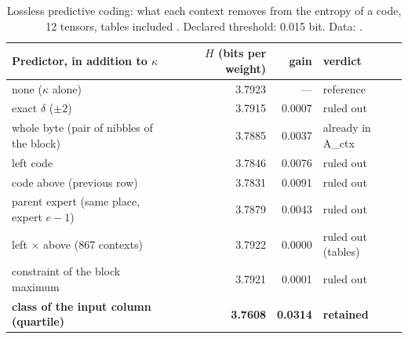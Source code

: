 \begin{table}[tbp]
\centering\small
\begin{tabular}{l r r l}
\toprule
Predictor, in addition to $\kappa$ & $H$ (bits per weight) & gain & verdict \\
\midrule
none ($\kappa$ alone) & 3.7923 & --- & reference \\
exact $\delta$ ($\pm 2$) & 3.7915 & 0.0007 & ruled out \\
whole byte (pair of nibbles of the block) & 3.7885 & 0.0037 & already in A\_ctx \\
left code & 3.7846 & 0.0076 & ruled out \\
code above (previous row) & 3.7831 & 0.0091 & ruled out \\
parent expert (same place, expert $e - 1$) & 3.7879 & 0.0043 & ruled out \\
left $\times$ above (867 contexts) & 3.7922 & 0.0000 & ruled out (tables) \\
constraint of the block maximum & 3.7921 & 0.0001 & ruled out \\
\textbf{class of the input column (quartile)} & \textbf{3.7608} & \textbf{0.0314} & \textbf{retained} \\
\bottomrule
\end{tabular}
\caption[What the neighbours say about a code]{Lossless predictive coding: what each context removes from the entropy of a code, 12 tensors, tables included \mes. Declared threshold: 0.015 bit. Data: .}
\label{t3pre:tab:contextes}
\end{table}

